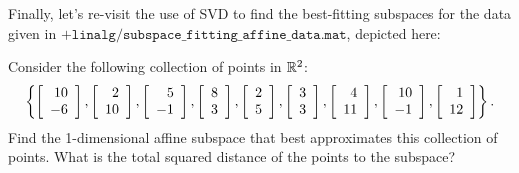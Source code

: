 \documentclass{ximera}
\begin{document}
 Finally, let's re-visit the use of SVD to find the best-fitting subspaces for the data given in $\texttt{+linalg/subspace\_fitting\_affine\_data.mat}$, depicted here:

 \begin{example}\label{ex:affine-subspace-fitting}
    Consider the following collection of points in $\R^2$:
    \begin{equation*}
      \set{
        \startmat{r} 10 \\ -6 \stopmat,
        \startmat{r} 2 \\ 10 \stopmat,
        \startmat{r} 5 \\ -1 \stopmat,
        \startmat{r} 8 \\ 3 \stopmat,
        \startmat{r} 2 \\ 5 \stopmat,
        \startmat{r} 3 \\ 3 \stopmat,
        \startmat{r} 4 \\ 11 \stopmat,
        \startmat{r} 10 \\ -1 \stopmat,
        \startmat{r} 1 \\ 12 \stopmat
      }.
    \end{equation*}
    Find the 1-dimensional affine subspace that best approximates this
    collection of points. What is the total squared distance of the
    points to the subspace?
  \end{example}
  
\end{document}

